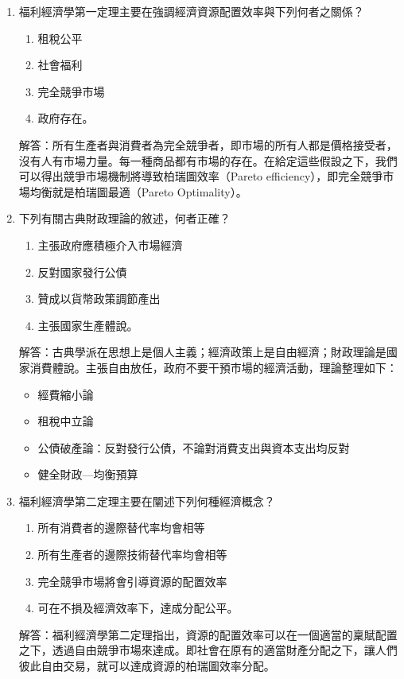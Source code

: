 \documentclass[12pt, a4paper]{article}
\begin{document}
\begin{enumerate}
    \item 福利經濟學第一定理主要在強調經濟資源配置效率與下列何者之關係？
        \begin{enumerate}[label=\Alph*.]
            \item 租稅公平
            \item 社會福利
            \item 完全競爭市場
            \item 政府存在。
        \end{enumerate}
        解答：所有生產者與消費者為完全競爭者，即市場的所有人都是價格接受者，沒有人有市場力量。每一種商品都有市場的存在。在給定這些假設之下，我們可以得出競爭市場機制將導致柏瑞圖效率（Pareto efficiency），即完全競爭市場均衡就是柏瑞圖最適（Pareto Optimality）。

    \item 下列有關古典財政理論的敘述，何者正確？
        \begin{enumerate}[label=\Alph*.]
            \item 主張政府應積極介入市場經濟
            \item 反對國家發行公債
            \item 贊成以貨幣政策調節產出
            \item 主張國家生產體說。
        \end{enumerate}
        解答：古典學派在思想上是個人主義；經濟政策上是自由經濟；財政理論是國家消費體說。主張自由放任，政府不要干預市場的經濟活動，理論整理如下：
        \begin{itemize}
            \item 經費縮小論
            \item 租稅中立論
            \item 公債破產論：反對發行公債，不論對消費支出與資本支出均反對
            \item 健全財政---均衡預算
        \end{itemize}

    \item 福利經濟學第二定理主要在闡述下列何種經濟概念？
        \begin{enumerate}[label=\Alph*.]
            \item 所有消費者的邊際替代率均會相等
            \item 所有生產者的邊際技術替代率均會相等
            \item 完全競爭市場將會引導資源的配置效率
            \item 可在不損及經濟效率下，達成分配公平。
        \end{enumerate}
        解答：福利經濟學第二定理指出，資源的配置效率可以在一個適當的稟賦配置之下，透過自由競爭市場來達成。即社會在原有的適當財產分配之下，讓人們彼此自由交易，就可以達成資源的柏瑞圖效率分配。


\end{enumerate}
\end{document}
